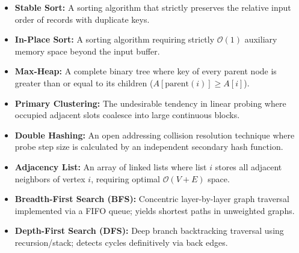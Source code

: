\documentclass[12pt,a4paper]{article}
\begin{document}
\begin{tcolorbox}[defbox, title={\textbf{One-Line Definitions}}]
\begin{itemize}[leftmargin=*, itemsep=2pt, topsep=0pt]
  \item \textbf{Stable Sort:} A sorting algorithm that strictly preserves the relative input order of records with duplicate keys.
  \item \textbf{In-Place Sort:} A sorting algorithm requiring strictly $\mathcal{O}(1)$ auxiliary memory space beyond the input buffer.
  \item \textbf{Max-Heap:} A complete binary tree where key of every parent node is greater than or equal to its children ($A[\text{parent}(i)] \ge A[i]$).
  \item \textbf{Primary Clustering:} The undesirable tendency in linear probing where occupied adjacent slots coalesce into large continuous blocks.
  \item \textbf{Double Hashing:} An open addressing collision resolution technique where probe step size is calculated by an independent secondary hash function.
  \item \textbf{Adjacency List:} An array of linked lists where list $i$ stores all adjacent neighbors of vertex $i$, requiring optimal $\mathcal{O}(V + E)$ space.
  \item \textbf{Breadth-First Search (BFS):} Concentric layer-by-layer graph traversal implemented via a FIFO queue; yields shortest paths in unweighted graphs.
  \item \textbf{Depth-First Search (DFS):} Deep branch backtracking traversal using recursion/stack; detects cycles definitively via back edges.
\end{itemize}
\end{tcolorbox}

\newpage
\end{document}
